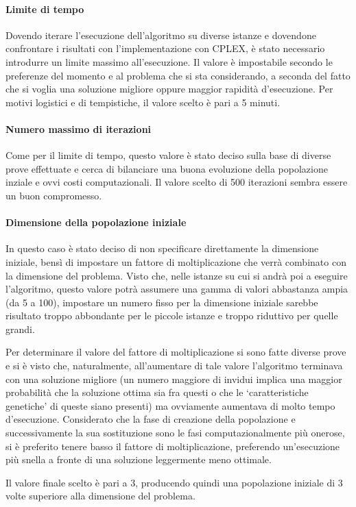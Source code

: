 \paragraph{Limite di tempo}
Dovendo iterare l'esecuzione dell'algoritmo su diverse istanze e dovendone confrontare i risultati
con l'implementazione con CPLEX, è stato necessario introdurre un limite massimo all'esecuzione.
Il valore è impostabile secondo le preferenze del momento e al problema che si sta considerando,
a seconda del fatto che si voglia una soluzione migliore oppure maggior rapidità d'esecuzione.
Per motivi logistici e di tempistiche, il valore scelto è pari a 5 minuti.
%
\paragraph{Numero massimo di iterazioni}
Come per il limite di tempo, questo valore è stato deciso sulla base di diverse prove effettuate
e cerca di bilanciare una buona evoluzione della popolazione inziale e ovvi costi computazionali.
Il valore scelto di 500 iterazioni sembra essere un buon compromesso.
%
\paragraph{Dimensione della popolazione iniziale}
In questo caso è stato deciso di non specificare direttamente la dimensione iniziale, bensì di impostare
un fattore di moltiplicazione che verrà combinato con la dimensione del problema.
Visto che, nelle istanze su cui si andrà poi a eseguire l'algoritmo, questo valore
potrà assumere una gamma di valori abbastanza ampia (da 5 a 100), impostare un numero fisso
per la dimensione iniziale sarebbe risultato troppo abbondante per le piccole istanze
e troppo riduttivo per quelle grandi.

Per determinare il valore del fattore di moltiplicazione si sono fatte diverse prove e si è visto
che, naturalmente, all'aumentare di tale valore l'algoritmo terminava con una soluzione migliore
(un numero maggiore di invidui implica una maggior probabilità che la soluzione ottima sia fra questi
o che le `caratteristiche genetiche' di queste siano presenti) ma ovviamente aumentava di molto tempo d'esecuzione.
Considerato che la fase di creazione della popolazione e successivamente la sua sostituzione sono le fasi
computazionalmente più onerose, si è preferito tenere basso il fattore di moltiplicazione, preferendo
un'esecuzione più snella a fronte di una soluzione leggermente meno ottimale.

Il valore finale scelto è pari a 3, producendo quindi una popolazione iniziale di 3 volte superiore
alla dimensione del problema.
%
